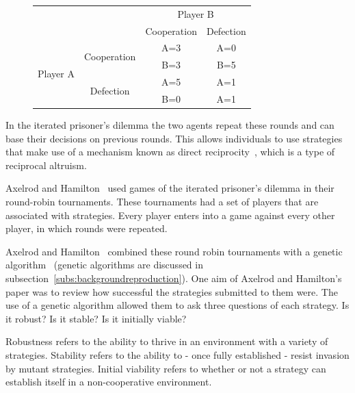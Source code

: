 \documentclass[]{final_report}
\begin{document}
\begin{figure}
\vspace{-20pt}
\begin{framed}
	\begin{center}
		\begin{tabular}{cc|c|c}
		& & \multicolumn{2}{c}{Player B}\\
		& & Cooperation & Defection\\
		\cline{1-4}
		\multirow{4}{*}{Player A} &\multirow{2}{*}{Cooperation} & A=3 & A=0\\
		& & B=3 & B=5\\
		\cline{2-4}
		& \multirow{2}{*}{Defection} & A=5 & A=1\\
		& & B=0 & A=1\\
		\end{tabular}
		\label{tab:payoffmatrix}
	\end{center}	
\end{framed}
\vspace{-20pt}
\end{figure}
In the iterated prisoner's dilemma the two agents repeat these rounds and can base their decisions on previous rounds. This allows individuals to use strategies that make use of a mechanism known as direct reciprocity~\cite{five_rules_coop}, which is a type of reciprocal altruism.\par 
Axelrod and Hamilton~\cite{evolution_of_cooperation} used games of the iterated prisoner's dilemma in their round-robin tournaments. These tournaments had a set of players that are associated with strategies. Every player enters into a game against every other player, in which rounds were repeated.\par 
Axelrod and Hamilton~\cite{evolution_of_cooperation} combined these round robin tournaments with a genetic algorithm~\cite{mitchell1998introduction} (genetic algorithms are discussed in subsection~\ref{subs:backgroundreproduction}). One aim of Axelrod and Hamilton's~\cite{evolution_of_cooperation} paper was to review how successful the strategies submitted to them were. The use of a genetic algorithm allowed them to ask three questions of each strategy. Is it robust? Is it stable? Is it initially viable?\par
Robustness refers to the ability to thrive in an environment with a variety of strategies. Stability refers to the ability to - once fully established - resist invasion by mutant strategies. Initial viability refers to whether or not a strategy can establish itself in a non-cooperative environment.\par
\end{document}

